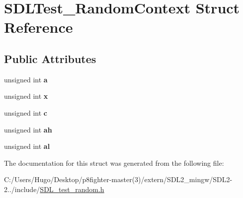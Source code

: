 \hypertarget{struct_s_d_l_test___random_context}{}\section{S\+D\+L\+Test\+\_\+\+Random\+Context Struct Reference}
\label{struct_s_d_l_test___random_context}
\subsection*{Public Attributes}
\begin{DoxyCompactItemize}
\item 
\mbox{\label{struct_s_d_l_test___random_context_a24f830d6cb476c96fbe325c99331e45f}} 
unsigned int {\bfseries a}
\item 
\mbox{\label{struct_s_d_l_test___random_context_a8bd6d1b4e1677ed1c06f5cc09f1af5b6}} 
unsigned int {\bfseries x}
\item 
\mbox{\label{struct_s_d_l_test___random_context_a17a6a7e7b68a33c67d9b74c8c7c33198}} 
unsigned int {\bfseries c}
\item 
\mbox{\label{struct_s_d_l_test___random_context_a2c8d2f1ee16cdfd38361b8f03b3fdb85}} 
unsigned int {\bfseries ah}
\item 
\mbox{\label{struct_s_d_l_test___random_context_a0e2bccd3611d383d6510c6c828aa54c4}} 
unsigned int {\bfseries al}
\end{DoxyCompactItemize}


The documentation for this struct was generated from the following file\+:\begin{DoxyCompactItemize}
\item 
C\+:/\+Users/\+Hugo/\+Desktop/p8fighter-\/master(3)/extern/\+S\+D\+L2\+\_\+mingw/\+S\+D\+L2-\/2../include/\hyperlink{_s_d_l__test__random_8h}{S\+D\+L\+\_\+test\+\_\+random.\+h}\end{DoxyCompactItemize}

